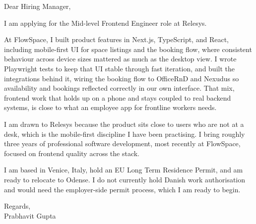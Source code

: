 \documentclass[a4paper,11pt]{article}
\begin{document}
Dear Hiring Manager,

I am applying for the Mid-level Frontend Engineer role at Relesys.

At FlowSpace, I built product features in Next.js, TypeScript, and React, including mobile-first UI for space listings and the booking flow, where consistent behaviour across device sizes mattered as much as the desktop view. I wrote Playwright tests to keep that UI stable through fast iteration, and built the integrations behind it, wiring the booking flow to OfficeRnD and Nexudus so availability and bookings reflected correctly in our own interface. That mix, frontend work that holds up on a phone and stays coupled to real backend systems, is close to what an employee app for frontline workers needs.

I am drawn to Relesys because the product sits close to users who are not at a desk, which is the mobile-first discipline I have been practising. I bring roughly three years of professional software development, most recently at FlowSpace, focused on frontend quality across the stack.

I am based in Venice, Italy, hold an EU Long Term Residence Permit, and am ready to relocate to Odense. I do not currently hold Danish work authorisation and would need the employer-side permit process, which I am ready to begin.

Regards,\\
Prabhavit Gupta
\end{document}
